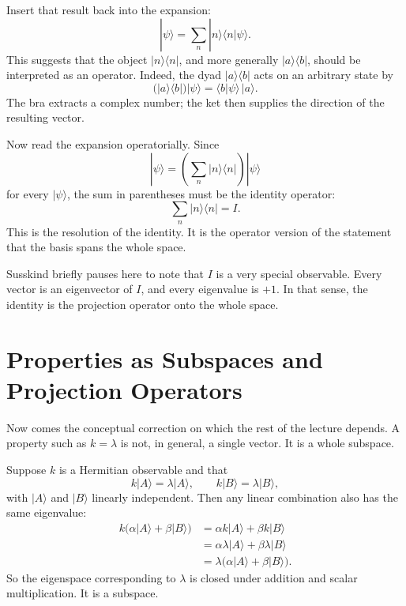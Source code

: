 Insert that result back into the expansion:
\begin{equation}
|\psi\rangle = \sum_n |n\rangle \langle n|\psi\rangle.
\end{equation}
This suggests that the object \(|n\rangle\langle n|\), and more generally \(|a\rangle\langle b|\), should be interpreted as an operator. Indeed, the dyad \(|a\rangle\langle b|\) acts on an arbitrary state by
\begin{equation}
\bigl(|a\rangle\langle b|\bigr)|\psi\rangle = \langle b|\psi\rangle\,|a\rangle.
\end{equation}
The bra extracts a complex number; the ket then supplies the direction of the resulting vector.

Now read the expansion operatorially. Since
\begin{equation}
|\psi\rangle = \left(\sum_n |n\rangle\langle n|\right)|\psi\rangle
\end{equation}
for every \(|\psi\rangle\), the sum in parentheses must be the identity operator:
\begin{equation}
\sum_n |n\rangle\langle n| = I.
\end{equation}
This is the resolution of the identity. It is the operator version of the statement that the basis spans the whole space.

Susskind briefly pauses here to note that \(I\) is a very special observable. Every vector is an eigenvector of \(I\), and every eigenvalue is \(+1\). In that sense, the identity is the projection operator onto the whole space.

\section{Properties as Subspaces and Projection Operators}

Now comes the conceptual correction on which the rest of the lecture depends. A property such as \(k=\lambda\) is not, in general, a single vector. It is a whole subspace.

Suppose \(k\) is a Hermitian observable and that
\begin{equation}
k|A\rangle = \lambda |A\rangle, \qquad
k|B\rangle = \lambda |B\rangle,
\end{equation}
with \(|A\rangle\) and \(|B\rangle\) linearly independent. Then any linear combination also has the same eigenvalue:
\begin{align}
k\bigl(\alpha|A\rangle+\beta|B\rangle\bigr)
  &= \alpha k|A\rangle + \beta k|B\rangle \\
  &= \alpha \lambda |A\rangle + \beta \lambda |B\rangle \\
  &= \lambda \bigl(\alpha|A\rangle+\beta|B\rangle\bigr).
\end{align}
So the eigenspace corresponding to \(\lambda\) is closed under addition and scalar multiplication. It is a subspace.

